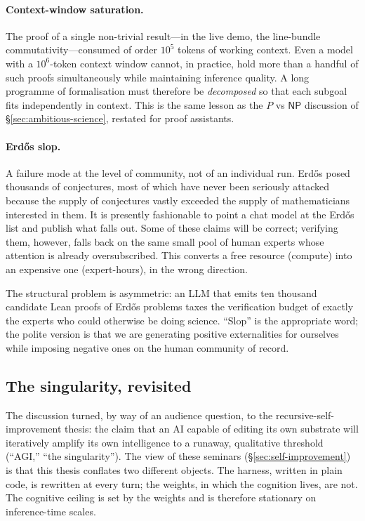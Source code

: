 \paragraph{Context-window saturation.}
The proof of a single non-trivial result---in the live
demo, the line-bundle commutativity---consumed of order
$10^5$ tokens of working context.  Even a model with a
$10^6$-token context window cannot, in practice, hold more
than a handful of such proofs simultaneously while
maintaining inference quality.  A long programme of
formalisation must therefore be \emph{decomposed} so that
each subgoal fits independently in context.  This is the
same lesson as the $P$ vs $\textsf{NP}$ discussion of
\S\ref{sec:ambitious-science}, restated for proof
assistants.

\paragraph{Erd\H{o}s slop.}
A failure mode at the level of community, not of an
individual run.  Erd\H{o}s posed thousands of conjectures,
most of which have never been seriously attacked because
the supply of conjectures vastly exceeded the supply of
mathematicians interested in them.  It is presently
fashionable to point a chat model at the Erd\H{o}s list and
publish what falls out.  Some of these claims will be
correct; verifying them, however, falls back on the same
small pool of human experts whose attention is already
oversubscribed.  This converts a free resource (compute)
into an expensive one (expert-hours), in the wrong
direction.

\begin{remark}
  The structural problem is asymmetric: an LLM that emits
  ten thousand candidate Lean proofs of Erd\H{o}s problems
  taxes the verification budget of exactly the experts who
  could otherwise be doing science.  ``Slop'' is the
  appropriate word; the polite version is that we are
  generating positive externalities for ourselves while
  imposing negative ones on the human community of record.
\end{remark}

\subsection{The singularity, revisited}\label{sec:singularity}

The discussion turned, by way of an audience question, to
the recursive-self-improvement thesis: the claim that an AI
capable of editing its own substrate will iteratively
amplify its own intelligence to a runaway, qualitative
threshold (``AGI,'' ``the singularity'').  The view of these
seminars (\S\ref{sec:self-improvement}) is that this thesis
conflates two different objects.  The harness, written in
plain code, is rewritten at every turn; the weights, in
which the cognition lives, are not.  The cognitive ceiling
is set by the weights and is therefore stationary on
inference-time scales.

